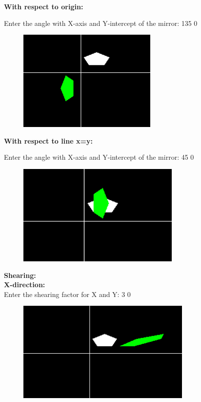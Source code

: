 \documentclass[9pt,letterpaper]{article}
\begin{document}
\newpage
\textbf{With respect to origin:}

Enter the angle with X-axis and Y-intercept of the mirror: 135 0

\begin{figure}[h]
    \centering
    \includegraphics[height=5cm]{Outputs/OP10.png}
\end{figure}

\textbf{With respect to line x=y:}

Enter the angle with X-axis and Y-intercept of the mirror: 45 0

\begin{figure}[h]
    \centering
    \includegraphics[height=5cm]{Outputs/OP11.png}
\end{figure}

\newpage
\textbf{\large{Shearing: }}\\
\textbf{X-direction:}\\

Enter the shearing factor for X and Y: 3 0

\begin{figure}[h]
    \centering
    \includegraphics[height=5cm]{Outputs/OP12.png}
\end{figure}
\end{document}
